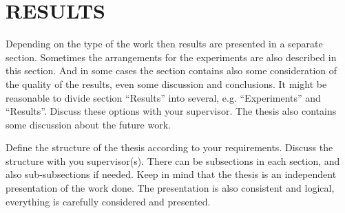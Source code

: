 \section{RESULTS}\label{sec:results}
\par Depending on the type of the work then results are presented in a separate section. Sometimes the arrangements for the experiments are also described in this section. And in some cases the section contains also some consideration of the quality of the results, even some discussion and conclusions. It might be reasonable to divide section ``Results'' into several, e.g. ``Experiments'' and ``Results''. Discuss these options with your supervisor.  The thesis also contains some discussion about the future work.
 
\par Define the structure of the thesis according to your requirements. Discuss the structure with you supervisor(s). There can be subsections in each section, and also sub-subsections if needed. Keep in mind that the thesis is an independent presentation of the work done. The presentation is also consistent and logical, everything is carefully considered and presented.  
